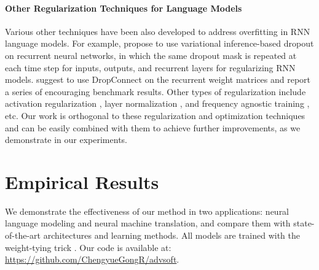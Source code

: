 \documentclass{article}
\begin{document}
\paragraph{Other Regularization Techniques for  
Language Models} 
Various other techniques have been also developed to address overfitting in RNN language models. 
For example, 
\citet{gal2016theoretically} propose to use variational inference-based dropout 
\citep{srivastava2014dropout} on recurrent neural networks, 
 in which the same dropout mask
 is repeated  at each time step for inputs, outputs, and recurrent layers  
for regularizing RNN models.  
\citet{merity2017regularizing} suggest to use DropConnect \citep{wan2013regularization} 
on the recurrent weight matrices and report a series of encouraging benchmark results.
Other types of regularization include 
activation regularization \citep{merity2017revisiting},
layer normalization \citep{ba2016layer}, 
and frequency agnostic training \citep{gong2018frage}, etc.
Our work is orthogonal to these regularization and optimization techniques
and can be easily combined with them to achieve further improvements, as we demonstrate in our experiments. 





%
 
\section{Empirical Results} 
\label{sec:experiement}
We demonstrate the effectiveness of our method
in two applications: neural language modeling and 
neural machine translation, and compare them with state-of-the-art architectures and learning methods.
All models are trained with the weight-tying trick \citep{press2016using, inan2016tying}. 
Our code is available at:~ \url{https://github.com/ChengyueGongR/advsoft}.
\end{document}
